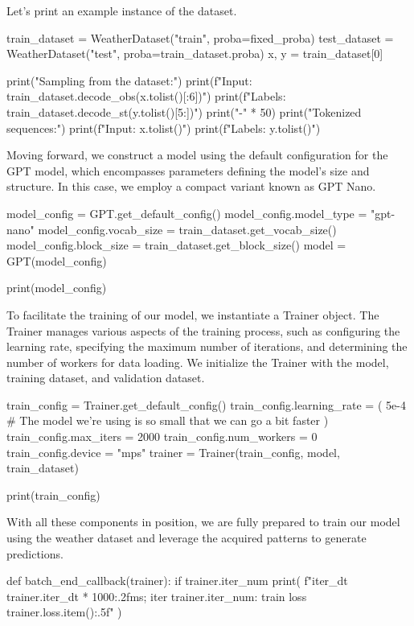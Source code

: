 \begin{exercise}
\begin{python}
\end{python}

Let's print an example instance of the dataset.
\begin{python}
train_dataset = WeatherDataset("train", proba=fixed_proba)
test_dataset = WeatherDataset("test", proba=train_dataset.proba)
x, y = train_dataset[0]

print("Sampling from the dataset:")
print(f"Input: {train_dataset.decode_obs(x.tolist()[:6])}")
print(f"Labels: {train_dataset.decode_st(y.tolist()[5:])}")
print("-" * 50)
print("Tokenized sequences:")
print(f"Input: {x.tolist()}")
print(f"Labels: {y.tolist()}")
\end{python}

Moving forward, we construct a model using the default configuration for the GPT model, which encompasses parameters defining the model's size and structure. In this case, we employ a compact variant known as GPT Nano.

\begin{python}
model_config = GPT.get_default_config()
model_config.model_type = "gpt-nano"
model_config.vocab_size = train_dataset.get_vocab_size()
model_config.block_size = train_dataset.get_block_size()
model = GPT(model_config)

print(model_config)
\end{python}

To facilitate the training of our model, we instantiate a Trainer object. The Trainer manages various aspects of the training process, such as configuring the learning rate, specifying the maximum number of iterations, and determining the number of workers for data loading. We initialize the Trainer with the model, training dataset, and validation dataset.

\begin{python}
train_config = Trainer.get_default_config()
train_config.learning_rate = (
    5e-4  # The model we're using is so small that we can go a bit faster
)
train_config.max_iters = 2000
train_config.num_workers = 0
train_config.device = "mps"
trainer = Trainer(train_config, model, train_dataset)

print(train_config)
\end{python}

With all these components in position, we are fully prepared to train our model using the weather dataset and leverage the acquired patterns to generate predictions.

\begin{python}
def batch_end_callback(trainer):
    if trainer.iter_num %
        print(
            f"iter_dt {trainer.iter_dt * 1000:.2f}ms; iter {trainer.iter_num}: train loss {trainer.loss.item():.5f}"
        )



\end{python}
\end{exercise}

